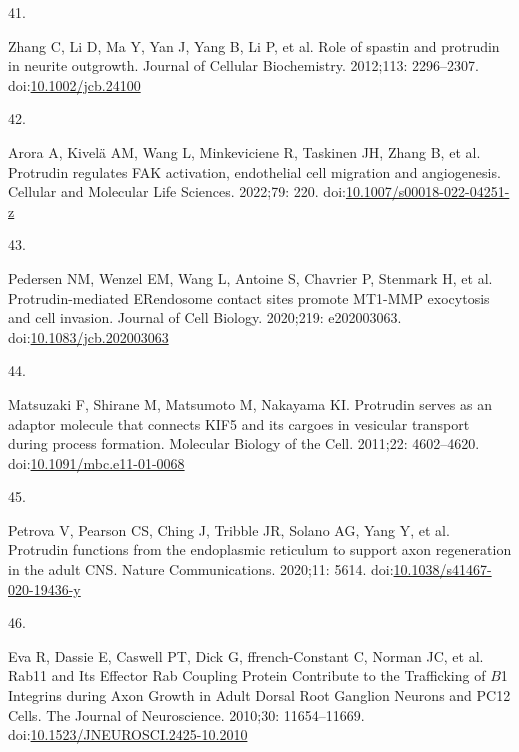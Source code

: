 \documentclass[
  12pt,
  a4paper,
]{book}
\newlength{\cslhangindent}
\newlength{\csllabelwidth}
\newlength{\cslentryspacingunit} %
\newenvironment{CSLReferences}[2] %
 {%
  \setlength{\parindent}{0pt}
  \ifodd #1
  \let\oldpar\par
  \def\par{\hangindent=\cslhangindent\oldpar}
  \fi
  \setlength{\parskip}{#2\cslentryspacingunit}
 }%
 {}
\newcommand{\CSLLeftMargin}[1]{\parbox[t]{\csllabelwidth}{#1}}
\newcommand{\CSLRightInline}[1]{\parbox[t]{\linewidth - \csllabelwidth}{#1}\break}
\begin{document}
\begin{CSLReferences}{0}{0}
\leavevmode{}%
\CSLLeftMargin{41. }%
\CSLRightInline{Zhang C, Li D, Ma Y, Yan J, Yang B, Li P, et al. Role of spastin and protrudin in neurite outgrowth. Journal of Cellular Biochemistry. 2012;113: 2296--2307. doi:\href{https://doi.org/10.1002/jcb.24100}{10.1002/jcb.24100}}

\leavevmode{}%
\CSLLeftMargin{42. }%
\CSLRightInline{Arora A, Kivelä AM, Wang L, Minkeviciene R, Taskinen JH, Zhang B, et al. Protrudin regulates {FAK} activation, endothelial cell migration and angiogenesis. Cellular and Molecular Life Sciences. 2022;79: 220. doi:\href{https://doi.org/10.1007/s00018-022-04251-z}{10.1007/s00018-022-04251-z}}

\leavevmode{}%
\CSLLeftMargin{43. }%
\CSLRightInline{Pedersen NM, Wenzel EM, Wang L, Antoine S, Chavrier P, Stenmark H, et al. Protrudin-mediated {ER}\textendash endosome contact sites promote {MT1-MMP} exocytosis and cell invasion. Journal of Cell Biology. 2020;219: e202003063. doi:\href{https://doi.org/10.1083/jcb.202003063}{10.1083/jcb.202003063}}

\leavevmode{}%
\CSLLeftMargin{44. }%
\CSLRightInline{Matsuzaki F, Shirane M, Matsumoto M, Nakayama KI. Protrudin serves as an adaptor molecule that connects {KIF5} and its cargoes in vesicular transport during process formation. Molecular Biology of the Cell. 2011;22: 4602--4620. doi:\href{https://doi.org/10.1091/mbc.e11-01-0068}{10.1091/mbc.e11-01-0068}}

\leavevmode{}%
\CSLLeftMargin{45. }%
\CSLRightInline{Petrova V, Pearson CS, Ching J, Tribble JR, Solano AG, Yang Y, et al. Protrudin functions from the endoplasmic reticulum to support axon regeneration in the adult {CNS}. Nature Communications. 2020;11: 5614. doi:\href{https://doi.org/10.1038/s41467-020-19436-y}{10.1038/s41467-020-19436-y}}

\leavevmode{}%
\CSLLeftMargin{46. }%
\CSLRightInline{Eva R, Dassie E, Caswell PT, Dick G, ffrench-Constant C, Norman JC, et al. Rab11 and {Its Effector Rab Coupling Protein Contribute} to the {Trafficking} of {\(B\)}1 {Integrins} during {Axon Growth} in {Adult Dorsal Root Ganglion Neurons} and {PC12 Cells}. The Journal of Neuroscience. 2010;30: 11654--11669. doi:\href{https://doi.org/10.1523/JNEUROSCI.2425-10.2010}{10.1523/JNEUROSCI.2425-10.2010}}


\end{CSLReferences}
\end{document}
